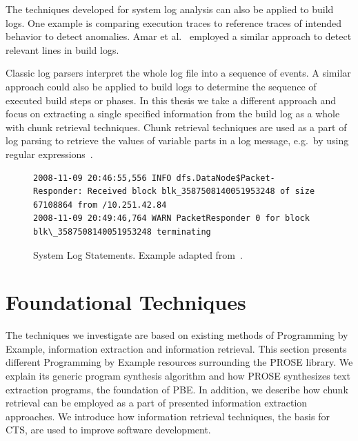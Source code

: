 \documentclass[\myrootdir/main.tex]{subfiles}
\begin{document}
The techniques developed for system log analysis can also be applied to build logs.
One example is comparing execution traces to reference traces of intended behavior to detect anomalies.
Amar et al.~\cite{amar2019mining} employed a similar approach to detect relevant lines in build logs.

Classic log parsers interpret the whole log file into a sequence of events.
A similar approach could also be applied to build logs to determine the sequence of executed build steps or phases.
In this thesis we take a different approach and focus on extracting a single specified information from the build log as a whole with chunk retrieval techniques.
Chunk retrieval techniques are used as a part of log parsing to retrieve the values of variable parts in a log message, e.g.\ by using regular expressions~\cite{nagappan2010abstracting,xu2009detecting}.

\begin{figure}[]
  \centering
  \begin{lstlisting}[breaklines=true]
2008-11-09 20:46:55,556 INFO dfs.DataNode$Packet- Responder: Received block blk_3587508140051953248 of size 67108864 from /10.251.42.84
2008-11-09 20:49:46,764 WARN PacketResponder 0 for block blk\_3587508140051953248 terminating
  \end{lstlisting}  
  \caption{System Log Statements. Example adapted from~\cite{he2017towards}.}
  \label{lst:system-log}
\end{figure}

\section{Foundational Techniques}
The techniques we investigate are based on existing methods of Programming by Example, information extraction and information retrieval.
This section presents different Programming by Example resources surrounding the PROSE library.
We explain its generic program synthesis algorithm and how PROSE synthesizes text extraction programs, the foundation of PBE\@.
In addition, we describe how chunk retrieval can be employed as a part of presented information extraction approaches.
We introduce how information retrieval techniques, the basis for CTS, are used to improve software development.
\end{document}
